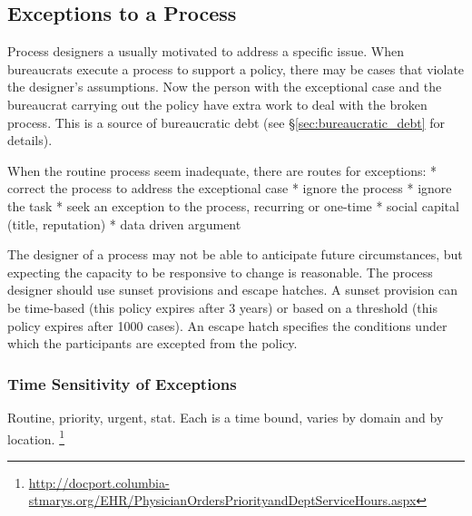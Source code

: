 \subsection{Exceptions to a Process\label{sec:exceptions-to-process}}

Process designers a usually motivated to address a specific issue. When bureaucrats execute a process to support a policy, there may be cases that violate the designer's assumptions. Now the person with the exceptional case and the bureaucrat carrying out the policy have extra work to deal with the broken process. This is a source of bureaucratic debt (see \S\ref{sec:bureaucratic_debt} for details). 

When the routine process seem inadequate, there are routes for exceptions:
* correct the process to address the exceptional case
* ignore the process
* ignore the task
* seek an exception to the process, recurring or one-time
  * social capital (title, reputation)
  * data driven argument 

The designer of a process may not be able to anticipate future circumstances, but expecting the capacity to be responsive to change is reasonable. The process designer should use sunset provisions and escape hatches.  
A sunset provision can be time-based (this policy expires after 3 years) or based on a threshold (this policy expires after 1000 cases). An escape hatch specifies the conditions under which the participants are excepted from the policy. 

\subsubsection{Time Sensitivity of Exceptions}
Routine, priority, urgent, stat. 
Each is a time bound, varies by domain and by location.
\footnote{\href{http://docport.columbia-stmarys.org/EHR/PhysicianOrdersPriorityandDeptServiceHours.aspx}{http://docport.columbia-stmarys.org/EHR/PhysicianOrdersPriorityandDeptServiceHours.aspx}}